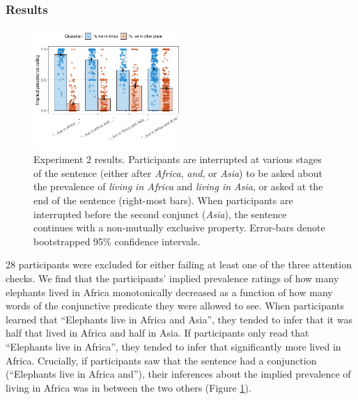 \documentclass[10pt,letterpaper]{article}
\newcommand{\mh}[1]{{\textcolor{Blue}{[mh: #1]}}}
\begin{document}
 \subsubsection{Results}
 
\begin{figure}[h]
  \centering
    \includegraphics[width=0.5\textwidth]{expt3_summary}
  \caption{Experiment 2 results. Participants are interrupted at various stages of the sentence (either after \emph{Africa}, \emph{and}, or \emph{Asia}) to be asked about the prevalence of \emph{living in Africa} and \emph{living in Asia}, or asked at the end of the sentence (right-most bars). When participants are interrupted before the second conjunct (\emph{Asia}), the sentence continues with a non-mutually exclusive property. Error-bars denote bootstrapped 95\% confidence intervals.}
    \label{fig:expt3}
  \end{figure}
  
% 

28 participants were excluded for either failing at least one of the three attention checks.
We find that the participants' implied prevalence ratings of how many elephants lived in Africa monotonically decreased as a function of how many words of the conjunctive predicate they were allowed to see. 
When participants learned that ``Elephants live in Africa and Asia'', they tended to infer that it was half that lived in Africa and half in Asia.
If participants only read that ``Elephants live in Africa'', they tended to infer that significantly more lived in Africa. 
Crucially, if participants saw that the sentence had a conjunction (``Elephants live in Africa and''), their inferences about the implied prevalence of living in Africa was in between the two others (Figure \ref{fig:expt3}).
\end{document}
